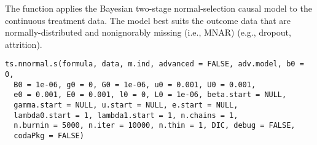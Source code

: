 \documentclass[a4paper]{book}
\begin{document}
%
\begin{Description}\relax
The  function applies the Bayesian two-stage normal-selection causal model to the continuous treatment data.
The model best suits the outcome data that are normally-distributed and nonignorably missing
(i.e., MNAR) (e.g., dropout, attrition).
\end{Description}
%
\begin{Usage}
\begin{verbatim}
ts.nnormal.s(formula, data, m.ind, advanced = FALSE, adv.model, b0 = 0,
  B0 = 1e-06, g0 = 0, G0 = 1e-06, u0 = 0.001, U0 = 0.001,
  e0 = 0.001, E0 = 0.001, l0 = 0, L0 = 1e-06, beta.start = NULL,
  gamma.start = NULL, u.start = NULL, e.start = NULL,
  lambda0.start = 1, lambda1.start = 1, n.chains = 1,
  n.burnin = 5000, n.iter = 10000, n.thin = 1, DIC, debug = FALSE,
  codaPkg = FALSE)
\end{verbatim}
\end{Usage}
%
\end{document}
